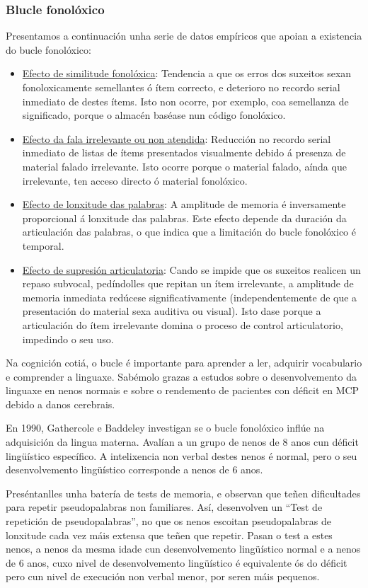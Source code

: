 \documentclass[a4paper,11pt]{article}
\begin{document}
\subsubsection{Blucle fonolóxico}
Presentamos a continuación unha serie de datos empíricos que apoian a existencia do bucle fonolóxico:
\begin{itemize}
	\item \underline{Efecto de similitude fonolóxica}: Tendencia a que os erros dos suxeitos sexan
	fonoloxicamente semellantes ó ítem correcto, e deterioro no recordo serial inmediato de destes
	ítems. Isto non ocorre, por exemplo, coa semellanza de significado, porque o almacén baséase nun
	código fonolóxico.
	\item \underline{Efecto da fala irrelevante ou non atendida}: Reducción no recordo serial
	inmediato de listas de ítems presentados visualmente debido á presenza de material falado
	irrelevante. Isto ocorre porque o material falado, aínda que irrelevante, ten acceso directo ó
	material fonolóxico.
	\item \underline{Efecto de lonxitude das palabras}: A amplitude de memoria é inversamente
	proporcional á lonxitude das palabras. Este efecto depende da duración da articulación das
	palabras, o que indica que a limitación do bucle fonolóxico é temporal.
	\item \underline{Efecto de supresión articulatoria}: Cando se impide que os suxeitos realicen un
	repaso subvocal, pedíndolles que repitan un ítem irrelevante, a amplitude de memoria inmediata
	redúcese significativamente (independentemente de que a presentación do material sexa auditiva ou
	visual). Isto dase porque a articulación do ítem irrelevante domina o proceso de control
	articulatorio, impedindo o seu uso.
\end{itemize}

Na cognición cotiá, o bucle é importante para aprender a ler, adquirir vocabulario e comprender a linguaxe. Sabémolo grazas a estudos sobre o desenvolvemento da linguaxe en nenos normais e sobre o rendemento de pacientes con déficit en MCP debido a danos cerebrais. 

En 1990, Gathercole e Baddeley investigan se o bucle fonolóxico inflúe na adquisición da lingua materna. Avalían a un grupo de nenos de 8 anos cun déficit lingüístico específico. A intelixencia non verbal destes nenos é normal, pero o seu desenvolvemento lingüístico corresponde a nenos de 6 anos.

Preséntanlles unha batería de tests de memoria, e observan que teñen dificultades para repetir pseudopalabras non familiares. Así, desenvolven un ``Test de repetición de pseudopalabras'', no que os nenos escoitan pseudopalabras de lonxitude cada vez máis extensa que teñen que repetir. Pasan o test a estes nenos, a nenos da mesma idade cun desenvolvemento lingüístico normal e a nenos de 6 anos, cuxo nivel de desenvolvemento lingüístico é equivalente ós do déficit pero cun nivel de execución non verbal menor, por seren máis pequenos. 
\end{document}
